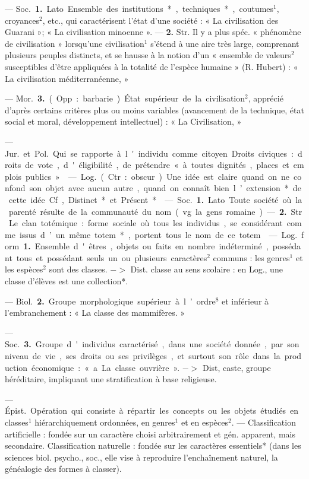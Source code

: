 \begin{itemize}[leftmargin=1cm, label=, itemsep=11pt]
 — \si{Soc.} {\bf 1.} Lato. Ensemble
des institutions*, techniques*, coutumes$^1$, croyances$^2$, etc., qui caractérisent l’état d’une société : « La
civilisation des Guarani »; « La
civilisation minoenne ». —  {\bf 2.} Str.
Il y a plus spéc. « phénomène de
civilisation » lorsqu'une civilisation$^1$
s’étend à une aire très large, comprenant plusieurs peuples distincts, et
se hausse à la notion d’un « ensemble
de valeurs$^2$ susceptibles d’être appliquées à la totalité de l'espèce
humaine » (R. Hubert) : « La civilisation méditerranéenne, »

— \si{Mor.}  {\bf 3.} (Opp. : barbarie.) État
supérieur de la civilisation$^2$, apprécié d’après certains critères plus ou
moins variables (avancement de la
technique, état social et moral, développement intellectuel) : « La Civilisation, »

 — \si{Jur.} et \si{Pol.} Qui se rapporte à l'individu comme citoyen.
Droits civiques : droits de vote,
d'éligibilité, de prétendre « à toutes
dignités, places et emplois publics ».

 — \si{Log.} (Ctr. : obscur). Une idée
est claire quand on ne confond son
objet avec aucun autre, quand on
connaît bien l’extension* de cette
idée. Cf, Distinct* et Présent*.

 — \si{Soc.} {\bf 1.} Lato. Toute société
où la parenté résulte de la communauté du nom (vg. la gens romaine).
—  {\bf 2.} Str. Le clan totémique : forme
sociale où tous les individus, se
considérant comme issus d’un même
totem*, portent tous le nom de ce
totem.

 — \si{Log.} form. {\bf 1.} Ensemble
d'êtres, objets ou faits en nombre
indéterminé, possédant tous et possédant seuls un ou plusieurs caractères$^2$ communs : les genres$^1$ et les
espèces$^2$ sont des classes. $->$ Dist.
classe au sens scolaire : en Log., une
classe d’élèves est une collection*.

— \si{Biol.}  {\bf 2.} Groupe morphologique supérieur à l’ordre$^8$ et inférieur à l’embranchement : « La classe
des mammifères. »

— \si{Soc.}  {\bf 3.} Groupe d'individus
caractérisé, dans une société donnée,
par son niveau de vie, ses droits ou
ses privilèges, et surtout son rôle
dans la production économique :
«a La classe ouvrière ». $->$ Dist,
caste, groupe héréditaire, impliquant
une stratification à base religieuse.

 — \si{Épist.} Opération qui
consiste à répartir les concepts ou
les objets étudiés en classes$^1$ hiérarchiquement ordonnées, en genres$^1$
et en espèces$^2$. — Classification artificielle : fondée sur un caractère
choisi arbitrairement et gén. apparent, mais secondaire. Classification
naturelle : fondée sur les caractères
essentiels* (dans les sciences biol.
psycho., soc., elle vise à reproduire
l’enchaînement naturel, la généalogie des formes à classer).


\end{itemize}
